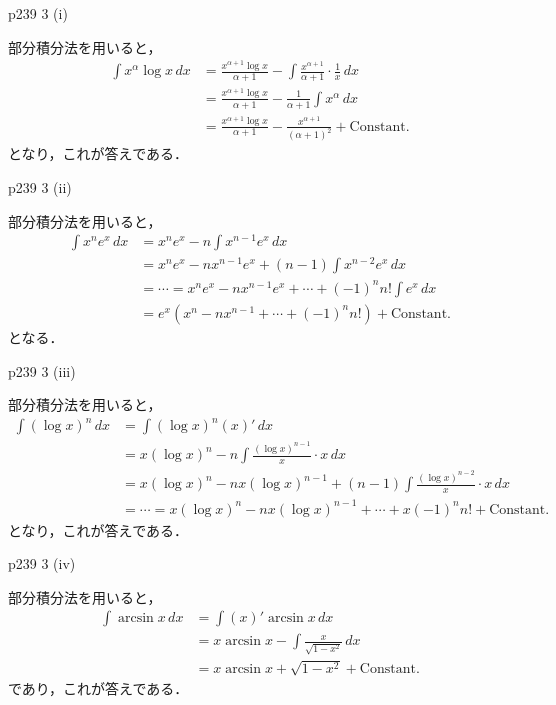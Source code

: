 \documentclass[dvipdfmx,uplatex,11pt]{jsarticle}
\theoremstyle{definition}
\begin{document}
\newpage

p239 3 (i)

\begin{leftbar}
    部分積分法を用いると，
    \begin{align*}
        \int x^\alpha \log x \, dx & = \frac{x^{\alpha +1} \log x}{\alpha +1}　- \int \frac{x^{\alpha +1}}{\alpha+1} \cdot \frac{1}{x} \, dx \\
        & = \frac{x^{\alpha +1} \log x}{\alpha +1}- \frac{1}{\alpha +1} \int x^{\alpha} \, dx \\
        & = \frac{x^{\alpha+1} \log x}{\alpha +1} - \frac{x^{\alpha +1}}{(\alpha +1)^2}+ \mathrm{Constant.}
    \end{align*}
    となり，これが答えである．
\end{leftbar}

p239 3 (ii)

\begin{leftbar}
    部分積分法を用いると，
    \begin{align*}
        \int x^n e^x \, dx & = x^n e^x - n \int x^{n-1} e^x \, dx \\
        & = x^n e^x - n x^{n-1} e^x + (n-1)\int x^{n-2} e^x \, dx \\
        & = \cdots = x^n e^x - n x^{n-1} e^x + \cdots + (-1)^n n! \int e^x \, dx \\
        & = e^x (x^n -n x^{n-1}+ \cdots +(-1)^n n!) + \mathrm{Constant.}
    \end{align*}
    となる．
\end{leftbar}

p239 3 (iii)
\begin{leftbar}
    部分積分法を用いると，
    \begin{align*}
        \int (\log x)^n \, dx & = \int (\log x)^n  (x)' \, dx \\
        & = x (\log x)^n - n \int  \frac{(\log x)^{n-1}}{x} \cdot  x \, dx \\
        & =  x (\log x)^n - n x(\log x)^{n-1} + (n-1) \int \frac{(\log x)^{n-2}}{x} \cdot x \, dx \\
        & = \cdots = x (\log x)^n - n x(\log x)^{n-1} + \cdots + x(-1)^n n!+\mathrm{Constant.}
    \end{align*}
    となり，これが答えである．
\end{leftbar}

\newpage 

p239 3 (iv)
\begin{leftbar}
    部分積分法を用いると，
    \begin{align*}
        \int \arcsin x \, dx & = \int (x)' \arcsin x \, dx \\
        & = x \arcsin x  - \int \frac{x}{\sqrt{1-x^2}} \, dx \\
        & = x \arcsin x + \sqrt{1-x^2} + \mathrm{Constant.}
    \end{align*}
    であり，これが答えである．
\end{leftbar}
\end{document}
